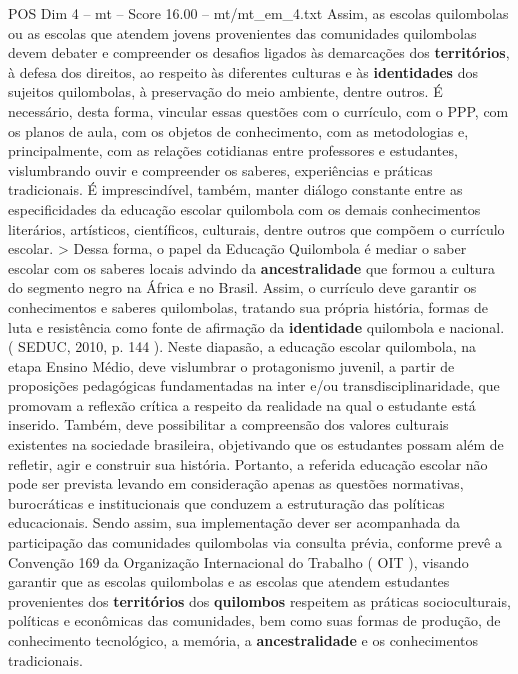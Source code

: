 \begin{textsample}{POS Dim 4 – mt – Score 16.00 – mt/mt\_em\_4.txt}
Assim, as escolas quilombolas ou as escolas que atendem jovens provenientes das comunidades quilombolas devem debater e compreender os desafios ligados às demarcações dos \textbf{territórios}, à defesa dos direitos, ao respeito às diferentes culturas e às \textbf{identidades} dos sujeitos quilombolas, à preservação do meio ambiente, dentre outros.
É necessário, desta forma, vincular essas questões com o currículo, com o PPP, com os planos de aula, com os objetos de conhecimento, com as metodologias e, principalmente, com as relações cotidianas entre professores e estudantes, vislumbrando ouvir e compreender os saberes, experiências e práticas tradicionais.
É imprescindível, também, manter diálogo constante entre as especificidades da educação escolar quilombola com os demais conhecimentos literários, artísticos, científicos, culturais, dentre outros que compõem o currículo escolar. > Dessa forma, o papel da Educação Quilombola é mediar o saber escolar com os saberes locais advindo da \textbf{ancestralidade} que formou a cultura do segmento negro na África e no Brasil.
Assim, o currículo deve garantir os conhecimentos e saberes quilombolas, tratando sua própria história, formas de luta e resistência como fonte de afirmação da \textbf{identidade} quilombola e nacional. ( SEDUC, 2010, p. 144 ).
Neste diapasão, a educação escolar quilombola, na etapa Ensino Médio, deve vislumbrar o protagonismo juvenil, a partir de proposições pedagógicas fundamentadas na inter e/ou transdisciplinaridade, que promovam a reflexão crítica a respeito da realidade na qual o estudante está inserido.
Também, deve possibilitar a compreensão dos valores culturais existentes na sociedade brasileira, objetivando que os estudantes possam além de refletir, agir e construir sua história.
Portanto, a referida educação escolar não pode ser prevista levando em consideração apenas as questões normativas, burocráticas e institucionais que conduzem a estruturação das políticas educacionais.
Sendo assim, sua implementação dever ser acompanhada da participação das comunidades quilombolas via consulta prévia, conforme prevê a Convenção 169 da Organização Internacional do Trabalho ( OIT ), visando garantir que as escolas quilombolas e as escolas que atendem estudantes provenientes dos \textbf{territórios} dos \textbf{quilombos} respeitem as práticas socioculturais, políticas e econômicas das comunidades, bem como suas formas de produção, de conhecimento tecnológico, a memória, a \textbf{ancestralidade} e os conhecimentos tradicionais.

\end{textsample}
